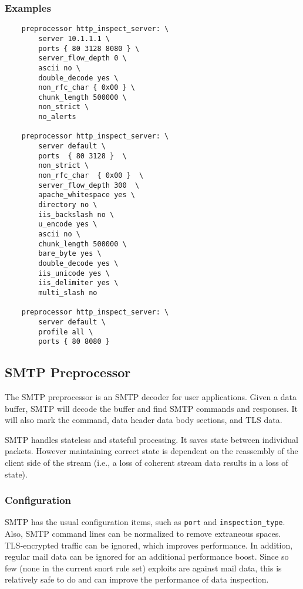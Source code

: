 \documentclass[english]{report}
\begin{document}
\subsubsection{Examples}

\begin{verbatim}
    preprocessor http_inspect_server: \
        server 10.1.1.1 \
        ports { 80 3128 8080 } \
        server_flow_depth 0 \
        ascii no \
        double_decode yes \
        non_rfc_char { 0x00 } \
        chunk_length 500000 \
        non_strict \
        no_alerts

    preprocessor http_inspect_server: \
        server default \ 
        ports  { 80 3128 }  \
        non_strict \
        non_rfc_char  { 0x00 }  \
        server_flow_depth 300  \
        apache_whitespace yes \
        directory no \
        iis_backslash no \
        u_encode yes \
        ascii no \
        chunk_length 500000 \
        bare_byte yes \
        double_decode yes \
        iis_unicode yes \ 
        iis_delimiter yes \
        multi_slash no

    preprocessor http_inspect_server: \
        server default \
        profile all \
        ports { 80 8080 }
\end{verbatim}

\subsection{SMTP Preprocessor}
\label{SMTP}

The SMTP preprocessor is an SMTP decoder for user applications.  Given a data
buffer, SMTP will decode the buffer and find SMTP commands and responses.  It
will also mark the command, data header data body sections, and TLS data.

SMTP handles stateless and stateful processing.  It saves state between
individual packets.  However maintaining correct state is dependent on the
reassembly of the client side of the stream (i.e., a loss of coherent stream data
results in a loss of state).

\subsubsection{Configuration}

SMTP has the usual configuration items, such as \texttt{port} and
\texttt{inspection\_type}.  Also, SMTP command lines can be normalized to
remove extraneous spaces.  TLS-encrypted traffic can be ignored, which improves
performance.  In addition, regular mail data can be ignored for an additional
performance boost.  Since so few (none in the current snort rule set) exploits
are against mail data, this is relatively safe to do and can improve the
performance of data inspection.
\end{document}
